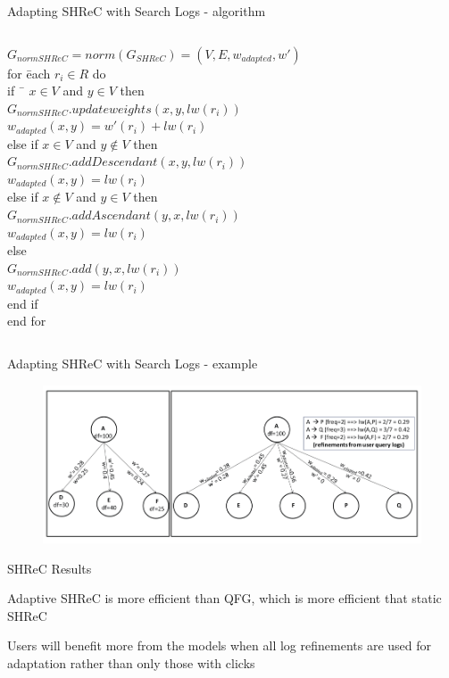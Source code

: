 \begin{frame}{Adapting SHReC with Search Logs - algorithm}
\begin{scriptsize}
\begin{columns}
		\begin{column}[l]{0.5\textwidth}
			\begin{tabbing}
				$ G_{normSHReC} = norm(G_{SHReC}) = (V, E, w_{adapted}, w') $ \\
				for \= each $ r_{i} \in R $ do \\
				\>	if \ \= $ x \in V $ and $ y \in V $ then \\
				\>	\>	$ G_{normSHReC}.updateweights(x, y, lw(r_{i})) $ \\
				\>	\>	$ w_{adapted}(x, y) = w'(r_{i}) + lw(r_{i}) $ \\
				\>	else if $ x \in V $ and $ y \notin V $ then \\
				\>	\>	$ G_{normSHReC}.addDescendant(x, y, lw(r_{i})) $ \\
				\>	\>	$ w_{adapted}(x, y) = lw(r_{i}) $ \\
				\>	else if $ x \notin V $ and $ y \in V $ then \\
				\>	\>	$ G_{normSHReC}.addAscendant(y, x, lw(r_{i})) $ \\
				\>	\>	$ w_{adapted}(x, y) = lw(r_{i}) $ \\
				\>	else \\
				\>	\>	$ G_{normSHReC}.add(y, x, lw(r_{i})) $ \\
				\>	\>	$ w_{adapted}(x, y) = lw(r_{i}) $ \\
				\>	end if \\
				end for \\
			\end{tabbing}
		\end{column}
	\end{columns}
\end{scriptsize}

\end{frame}


\begin{frame}{Adapting SHReC with Search Logs - example}

\begin{figure}
	\includegraphics[scale=0.3]{img/A-SHReC-Example.png}
\end{figure}

\end{frame}


\begin{frame}{SHReC Results}

Adaptive SHReC is more efficient than QFG, which is more efficient that static SHReC \newline

Users will benefit more from the models when all log refinements are used for adaptation rather than only those with clicks

\end{frame}

